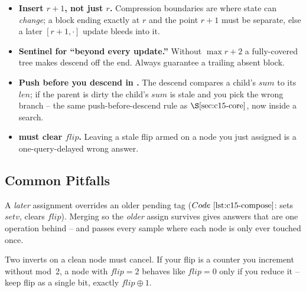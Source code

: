 \begin{hardeningbox}
\begin{itemize}[nosep,leftmargin=1.4em]
  \item \textbf{Insert \(r+1\), not just \(r\).}  Compression boundaries are where state can \emph{change}; a block ending exactly at \(r\) and the point \(r+1\) must be separate, else a later \([r+1,\cdot]\) update bleeds into it.
  \item \textbf{Sentinel for ``beyond every update.''}  Without \(\max r+2\) a fully-covered tree makes  descend off the end.  Always guarantee a trailing absent block.
  \item \textbf{Push before you descend in .}  The descend compares a child's \(\mathit{sum}\) to its \(\mathit{len}\); if the parent is dirty the child's \(\mathit{sum}\) is stale and you pick the wrong branch -- the same push-before-descend rule as \(\secref{c15-core}\), now inside a search.
  \item \textbf{ must clear \(\mathit{flip}\).}  Leaving a stale flip armed on a node you just assigned is a one-query-delayed wrong answer.
\end{itemize}
\end{hardeningbox}

\subsection{Common Pitfalls}

\begin{warningbox}
A \emph{later} assignment overrides an older pending tag (\(\coderef{c15-compose}\):  sets \(\mathit{setv}\), clears \(\mathit{flip}\)).  Merging so the \emph{older} assign survives gives answers that are one operation behind -- and passes every sample where each node is only ever touched once.
\end{warningbox}

\begin{warningbox}[Trap 2: forgetting \(\mathit{flip}^2=\mathit{id}\)]
Two inverts on a clean node must cancel.  If your flip is a counter you increment without mod~2, a node with \(\mathit{flip}=2\) behaves like \(\mathit{flip}=0\) only if you reduce it -- keep flip as a single bit, exactly \(\mathit{flip}\oplus1\).
\end{warningbox}

